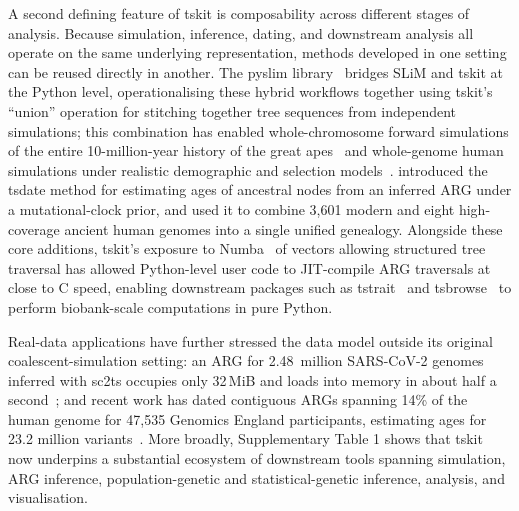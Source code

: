 \documentclass{article}
\begin{document}
A second defining feature of tskit is composability across different
stages of analysis.
Because simulation, inference, dating, and downstream analysis all
operate on the same underlying representation, methods developed in
one setting can be reused directly in another.
The pyslim library~\citep{gopalan2025bridging} bridges SLiM and tskit
at the Python level, operationalising these hybrid workflows together
using tskit's ``union'' operation for stitching together tree
sequences from independent simulations; this combination has enabled
whole-chromosome forward simulations of the entire 10-million-year
history of the great apes~\citep{rodrigues2024shared} and
whole-genome human simulations under realistic demographic and
selection models~\citep{haller2025simHumanity}.
\citet{wohns2022unified} introduced the tsdate method for estimating
ages of ancestral nodes from an inferred ARG under a mutational-clock
prior, and used it to combine 3{,}601 modern and eight high-coverage
ancient human genomes into a single unified genealogy.
Alongside these core additions, tskit's exposure to Numba~\citep{lam2015numba}
of vectors allowing structured tree traversal
has allowed Python-level user code to JIT-compile ARG traversals at close to C speed,
enabling downstream packages such as
tstrait~\citep{tagami2024tstrait} and
tsbrowse~\citep{karthikeyan2025tsbrowse}
to perform biobank-scale computations in pure Python.

Real-data applications have further stressed the data model outside
its original coalescent-simulation setting: an ARG for 2.48~million
SARS-CoV-2 genomes inferred with sc2ts occupies only 32\,MiB and
loads into memory in about half a
second~\citep{zhan2025pandemic}; and recent work has dated contiguous
ARGs spanning 14\% of the human genome for 47,535 Genomics England
participants, estimating ages for 23.2 million
variants~\citep{pope2026tracing}.
More broadly, Supplementary Table 1 shows that tskit now underpins a substantial
ecosystem of downstream tools spanning simulation, ARG inference,
population-genetic and statistical-genetic inference, analysis, and
visualisation.
\end{document}
